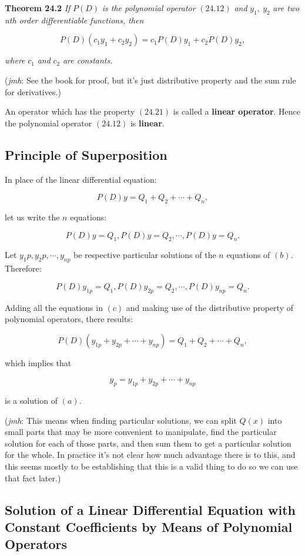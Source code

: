 \documentclass{article}
\begin{document}
\textbf{Theorem 24.2} \emph{If} $P(D)$ \emph{is the polynomial operator} $(24.12)$ \emph{and} $y_1,~y_2$ \emph{are two nth order differentiable functions, then}

\[ \tag{24.21} P(D)(c_1 y_1 + c_2 y_2) = c_1 P(D) y_1 + c_2 P(D) y_2, \]

\emph{where} $c_1$ \emph{and} $c_2$ \emph{are constants.} 

(\emph{jmh}: See the book for proof, but it's just distributive property and the sum rule for derivatives.)

An operator which has the property $(24.21)$ is called a \textbf{linear operator}. Hence the polynomial operator $(24.12)$ is \textbf{linear}.

\subsection{Principle of Superposition}

In place of the linear differential equation:

\[ \tag{a} P(D)y = Q_1 + Q_2 + \cdots + Q_n, \]

let us write the $n$ equations:

\[ \tag{b} P(D)y = Q_1, P(D)y = Q_2, \cdots, P(D)y = Q_n. \]

Let $y_1 p, y_2 p, \cdots, y_{np}$ be respective particular solutions of the $n$ equations of $(b)$. Therefore:

\[ \tag{c} P(D)y_{1p} = Q_1, P(D)y_{2p} = Q_2,\cdots, P(D)y_{np} = Q_n. \]

Adding all the equations in $(c)$ and making use of the distributive property of polynomial operators, there results:

\[ \tag{d} P(D)(y_{1p} + y_{2p} + \cdots + y_{np}) = Q_1 + Q_2 + \cdots + Q_n, \]

which implies that

\[ \tag{e} y_p = y_{1p} + y_{2p} + \cdots + y_{np} \]

is a solution of $(a)$.

(\emph{jmh}: This means when finding particular solutions, we can split $Q(x)$ into small parts that may be more convenient to manipulate, find the particular solution for each of those parts, and then sum them to get a particular solution for the whole. In practice it's not clear how much advantage there is to this, and this seems mostly to be establishing that this is a valid thing to do so we can use that fact later.)

\subsection{Solution of a Linear Differential Equation with Constant Coefficients by Means of Polynomial Operators}
\end{document}
